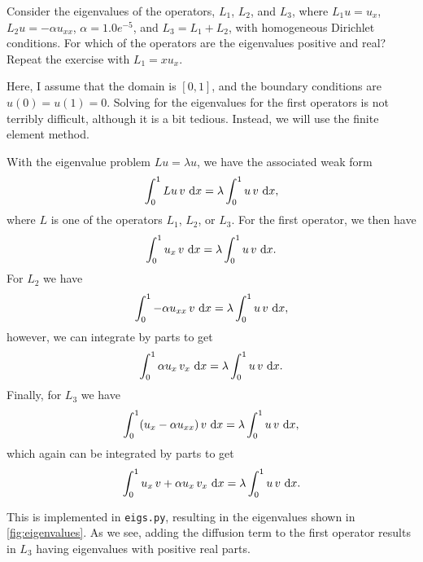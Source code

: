 \begin{exercise}{5.6}
    Consider the eigenvalues of the operators, $L_1$, $L_2$, and $L_3$, where $L_1 u = u_x$, $L_2 u = -\alpha u_{xx}$, $\alpha = 1.0 e^{-5}$, and $L_3 = L_1 + L_2$, with homogeneous Dirichlet conditions.
    For which of the operators are the eigenvalues positive and real?
    Repeat the exercise with $L_1 = x u_x$.
\end{exercise}

\begin{solution}{5.6}
    Here, I assume that the domain is $[0, 1]$, and the boundary conditions are $u(0) = u(1) = 0$.
    Solving for the eigenvalues for the first operators is not terribly difficult, although it is a bit tedious.
    Instead, we will use the finite element method.

    With the eigenvalue problem $L u = \lambda u$, we have the associated weak form
    \begin{equation*}
        \int_0^1 L u \, v \, \mathop{}\!\mathrm{d} x = \lambda \int_0^1 u \, v \, \mathop{}\!\mathrm{d} x,
    \end{equation*}
    where $L$ is one of the operators $L_1$, $L_2$, or $L_3$.
    For the first operator, we then have
    \begin{equation*}
        \int_0^1 u_x \, v \, \mathop{}\!\mathrm{d} x = \lambda \int_0^1 u \, v \, \mathop{}\!\mathrm{d} x.
    \end{equation*}
    For $L_2$ we have
    \begin{equation*}
        \int_{0}^{1} -\alpha u_{xx} \, v \, \mathop{}\!\mathrm{d} x = \lambda \int_{0}^{1} u \, v \, \mathop{}\!\mathrm{d} x,
    \end{equation*}
    however, we can integrate by parts to get
    \begin{equation*}
        \int_{0}^{1} \alpha u_x \, v_x \, \mathop{}\!\mathrm{d} x = \lambda \int_{0}^{1} u \, v \, \mathop{}\!\mathrm{d} x.
    \end{equation*}
    Finally, for $L_3$ we have
    \begin{equation*}
        \int_{0}^{1} (u_x - \alpha u_{xx}) \, v \, \mathop{}\!\mathrm{d} x = \lambda \int_{0}^{1} u \, v \, \mathop{}\!\mathrm{d} x,
    \end{equation*}
    which again can be integrated by parts to get
    \begin{equation*}
        \int_{0}^{1} u_x \, v  + \alpha u_x \, v_x \, \mathop{}\!\mathrm{d} x = \lambda \int_{0}^{1} u \, v \, \mathop{}\!\mathrm{d} x.
    \end{equation*}

    This is implemented in \texttt{eigs.py}, resulting in the eigenvalues shown in \cref{fig:eigenvalues}.
    As we see, adding the diffusion term to the first operator results in $L_3$ having eigenvalues with positive real parts.


\end{solution}
